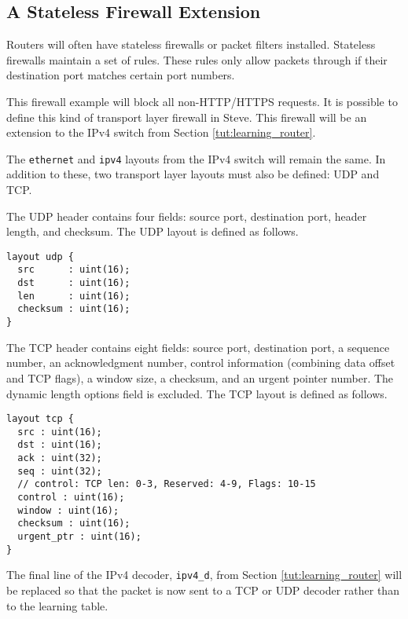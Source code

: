 \subsection{A Stateless Firewall Extension} \label{tut:firewall}

Routers will often have stateless firewalls or packet filters installed. 
Stateless firewalls maintain a set of rules. These rules only allow packets 
through if their destination port matches certain port numbers. 

This firewall example will block all non-HTTP/HTTPS requests.
It is possible to define this kind of transport layer firewall in Steve. This firewall will be an extension to the IPv4 switch from Section \ref{tut:learning_router}.

The \texttt{ethernet} and \texttt{ipv4} layouts from the IPv4 switch will remain the same. 
In addition to these, two transport layer layouts must also be defined: UDP and TCP.

The UDP header \cite{udp_std} contains four fields: source port, destination port, header length, and checksum. The UDP layout is defined as follows.

\begin{codepage}
\begin{lstlisting}
layout udp {
  src      : uint(16);
  dst      : uint(16);
  len      : uint(16);
  checksum : uint(16);
}
\end{lstlisting}
\end{codepage}

The TCP header \cite{tcp_std} contains eight fields: source port, destination 
port, a sequence number, an acknowledgment number, control information (combining 
data offset and TCP flags), a window size, a checksum, and an urgent pointer 
number. 
The dynamic length options field is excluded. The TCP layout is defined as follows.

\begin{codepage}
\begin{lstlisting}
layout tcp {
  src : uint(16);
  dst : uint(16);
  ack : uint(32);
  seq : uint(32);
  // control: TCP len: 0-3, Reserved: 4-9, Flags: 10-15
  control : uint(16); 
  window : uint(16);
  checksum : uint(16);
  urgent_ptr : uint(16);
}
\end{lstlisting}
\end{codepage}

The final line of the IPv4 decoder, \texttt{ipv4\_d}, from Section \ref{tut:learning_router} will be replaced so that the packet is now sent to a TCP or UDP decoder rather than to the learning table.

